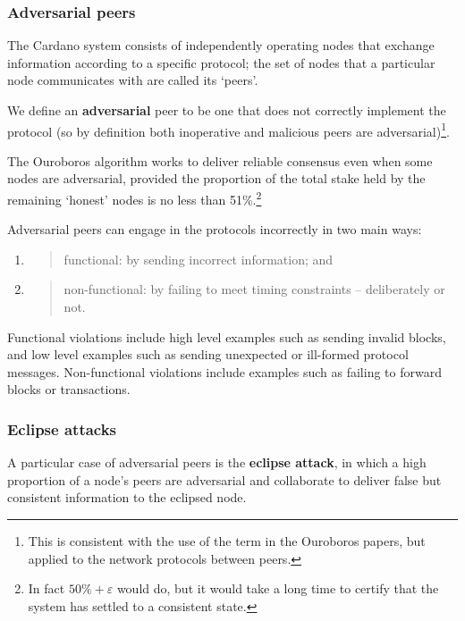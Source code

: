 \documentclass[11pt,a4paper]{article}
\begin{document}
\subsubsection{Adversarial peers}
\label{adversarial-peers}

The Cardano system consists of independently operating nodes that
exchange information according to a specific protocol; the set of nodes
that a particular node communicates with are called its `peers'.

We define an \textbf{adversarial} peer to be one that does not correctly
implement the protocol (so by definition both inoperative and malicious
peers are adversarial)\footnote{This is consistent with the use of the
  term in the Ouroboros papers, but applied to the network protocols
  between peers.}.

The Ouroboros algorithm works to deliver reliable consensus even when
some nodes are adversarial, provided the proportion of the total stake
held by the remaining `honest' nodes is no less than 51\%.\footnote{In
  fact $50\%+\varepsilon$ would do, but it would take a long time to certify that
  the system has settled to a consistent state.}

Adversarial peers can engage in the protocols incorrectly in two main
ways:

\begin{enumerate}
\def\labelenumi{\arabic{enumi}.}
\item
  \begin{quote}
  functional: by sending incorrect information; and
  \end{quote}
\item
  \begin{quote}
  non-functional: by failing to meet timing constraints -- deliberately
  or not.
  \end{quote}
\end{enumerate}

Functional violations include high level examples such as sending
invalid blocks, and low level examples such as sending unexpected or
ill-formed protocol messages. Non-functional violations include examples
such as failing to forward blocks or transactions.

\subsubsection{Eclipse attacks}
\label{eclipse-attacks}

A particular case of adversarial peers is the \textbf{eclipse attack},
in which a high proportion of a node's peers are adversarial and
collaborate to deliver false but consistent information to the eclipsed
node.
\end{document}
